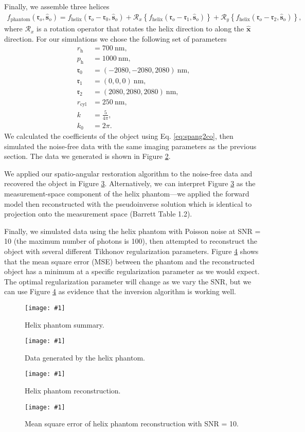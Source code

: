 \documentclass[11pt]{article}
\providecommand{\mc}[1]{\mathcal{#1}}
\providecommand{\ro}{\mathbf{\mathfrak{r}}_o}
\providecommand{\so}{\mathbf{\hat{s}}_o}
\providecommand{\mh}[1]{\mathbf{\hat{#1}}}
\providecommand{\fig}[4]{
\begin{figure}[H]
 \captionsetup{width=1.0\linewidth}
 \centering
 \texttt{[image: \#1]}
 \caption{#3}
 \label{fig:#4}
\end{figure}
}
\begin{document}
Finally, we assemble three helices
\begin{align}
  f_{\text{phantom}}(\ro, \so) = f_{\text{helix}}(\ro - \mathbf{\mathfrak{r}}_0, \so) + \mc{R}_x\left\{f_{\text{helix}}(\ro - \mathbf{\mathfrak{r}}_1, \so)\right\} + \mc{R}_y\left\{f_{\text{helix}}(\ro - \mathbf{\mathfrak{r}}_2, \so)\right\}, 
\end{align}
where $\mathcal{R}_x$ is a rotation operator that rotates the helix direction to
along the $\mh{x}$ direction. For our simulations we chose the following set of parameters
\begin{align}
  r_{\text{h}} &= 700\ \text{nm},\\
  p_{\text{h}} &= 1000\ \text{nm},\\
  \mathbf{\mathfrak{r}}_0 &= (-2080,-2080,2080)\ \text{nm},\\
  \mathbf{\mathfrak{r}}_1 &= (0,0,0)\ \text{nm},\\
  \mathbf{\mathfrak{r}}_2 &= (2080,2080,2080)\ \text{nm},\\
  r_{\text{cyl}} &= 250\ \text{nm},\\
  k &= \frac{5}{4\pi},\\
  k_0 &= 2\pi.
\end{align}
We calculated the coefficients of the object using Eq. \ref{eq:spang2co}, then
simulated the noise-free data with the same imaging parameters as the previous
section. The data we generated is shown in Figure \ref{fig:data}.

We applied our spatio-angular restoration algorithm to the noise-free data and
recovered the object in Figure \ref{fig:recon}. Alternatively, we can interpret
Figure \ref{fig:recon} as the measurement-space component of the helix
phantom---we applied the forward model then reconstructed with the pseudoinverse
solution which is identical to projection onto the measurement space (Barrett
Table 1.2).

Finally, we simulated data using the helix phantom with Poisson noise at SNR =
10 (the maximum number of photons is 100), then attempted to reconstruct the
object with several different Tikhonov regularization parameters. Figure
\ref{fig:recontik} shows that the mean square error (MSE) between the phantom
and the reconstructed object has a minimum at a specific regularization
parameter as we would expect. The optimal regularization parameter will change
as we vary the SNR, but we can use Figure \ref{fig:recontik} as evidence that
the inversion algorithm is working well.

\fig{../figures/helix/phantom.pdf}{1.0}{Helix phantom summary.}{phant}
\fig{../figures/helix/data.pdf}{1.0}{Data generated by the helix phantom.}{data}
\fig{../figures/helix/phantom-recon.pdf}{1.0}{Helix phantom reconstruction.}{recon}
\fig{../figures/helix-noise/mse.pdf}{0.5}{Mean square error of helix phantom reconstruction with SNR = 10.}{recontik}
\end{document}
